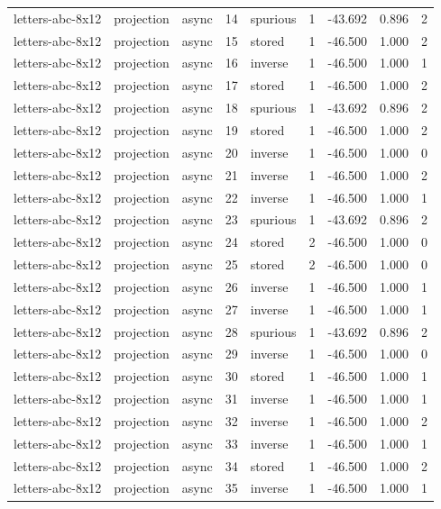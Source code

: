\begin{tabular}{lllrlrrrr}
letters-abc-8x12 & projection & async & 14 & spurious & 1 & -43.692 & 0.896 & 2 \\
letters-abc-8x12 & projection & async & 15 & stored & 1 & -46.500 & 1.000 & 2 \\
letters-abc-8x12 & projection & async & 16 & inverse & 1 & -46.500 & 1.000 & 1 \\
letters-abc-8x12 & projection & async & 17 & stored & 1 & -46.500 & 1.000 & 2 \\
letters-abc-8x12 & projection & async & 18 & spurious & 1 & -43.692 & 0.896 & 2 \\
letters-abc-8x12 & projection & async & 19 & stored & 1 & -46.500 & 1.000 & 2 \\
letters-abc-8x12 & projection & async & 20 & inverse & 1 & -46.500 & 1.000 & 0 \\
letters-abc-8x12 & projection & async & 21 & inverse & 1 & -46.500 & 1.000 & 2 \\
letters-abc-8x12 & projection & async & 22 & inverse & 1 & -46.500 & 1.000 & 1 \\
letters-abc-8x12 & projection & async & 23 & spurious & 1 & -43.692 & 0.896 & 2 \\
letters-abc-8x12 & projection & async & 24 & stored & 2 & -46.500 & 1.000 & 0 \\
letters-abc-8x12 & projection & async & 25 & stored & 2 & -46.500 & 1.000 & 0 \\
letters-abc-8x12 & projection & async & 26 & inverse & 1 & -46.500 & 1.000 & 1 \\
letters-abc-8x12 & projection & async & 27 & inverse & 1 & -46.500 & 1.000 & 1 \\
letters-abc-8x12 & projection & async & 28 & spurious & 1 & -43.692 & 0.896 & 2 \\
letters-abc-8x12 & projection & async & 29 & inverse & 1 & -46.500 & 1.000 & 0 \\
letters-abc-8x12 & projection & async & 30 & stored & 1 & -46.500 & 1.000 & 1 \\
letters-abc-8x12 & projection & async & 31 & inverse & 1 & -46.500 & 1.000 & 1 \\
letters-abc-8x12 & projection & async & 32 & inverse & 1 & -46.500 & 1.000 & 2 \\
letters-abc-8x12 & projection & async & 33 & inverse & 1 & -46.500 & 1.000 & 1 \\
letters-abc-8x12 & projection & async & 34 & stored & 1 & -46.500 & 1.000 & 2 \\
letters-abc-8x12 & projection & async & 35 & inverse & 1 & -46.500 & 1.000 & 1 \\

\end{tabular}
